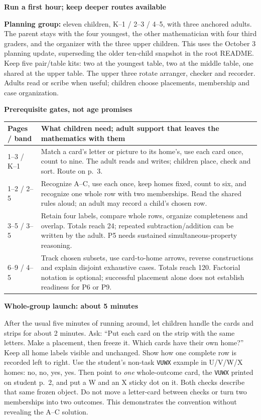 \documentclass[11pt]{article}
\newcommand{\heading}[1]{\par\textbf{\large #1}\par}
\newcommand{\subhead}[1]{\par\textbf{#1}\par}
\newcommand{\row}[1]{\texttt{#1}}
\newcommand{\guidepage}{\newpage}
\begin{document}
\guidepage
\heading{Run a first hour; keep deeper routes available}

\textbf{Planning group:} eleven children, K--1 / 2--3 / 4--5, with three anchored adults. The parent stays with the four youngest, the other mathematician with four third graders, and the organizer with the three upper children. This uses the October 3 planning update, superseding the older ten-child snapshot in the root README. Keep five pair/table kits: two at the youngest table, two at the middle table, one shared at the upper table. The upper three rotate arranger, checker and recorder. Adults read or scribe when useful; children choose placements, membership and case organization.

\subhead{Prerequisite gates, not age promises}
\begin{tabularx}{\linewidth}{@{}p{24mm}X@{}}\toprule
Pages / band & What children need; adult support that leaves the mathematics with them\\\midrule
1--3 / K--1 & Match a card's letter or picture to its home's, use each card once, count to nine. The adult reads and writes; children place, check and sort. Route on p.~3.\\
1--2 / 2--5 & Recognize A--C, use each once, keep homes fixed, count to six, and recognize one whole row with two memberships. Read the shared rules aloud; an adult may record a child's chosen row.\\
3--5 / 3--5 & Retain four labels, compare whole rows, organize completeness and overlap. Totals reach 24; repeated subtraction/addition can be written by the adult. P5 needs sustained simultaneous-property reasoning.\\
6--9 / 4--5 & Track chosen subsets, use card-to-home arrows, reverse constructions and explain disjoint exhaustive cases. Totals reach 120. Factorial notation is optional; successful placement alone does not establish readiness for P6 or P9.\\\bottomrule
\end{tabularx}

\subhead{Whole-group launch: about 5 minutes}
After the usual five minutes of running around, let children handle the cards and strips for about 2 minutes. Ask: ``Put each card on the strip with the same letters. Make a placement, then freeze it. Which cards have their own home?'' Keep all home labels visible and unchanged. Show how one complete row is recorded left to right. Use the student's non-task \row{VUWX} example in U/V/W/X homes: no, no, yes, yes. Then point to \emph{one} whole-outcome card, the \row{VUWX} printed on student p.~2, and put a W and an X sticky dot on it. Both checks describe that same frozen object. Do not move a letter-card between checks or turn two memberships into two outcomes. This demonstrates the convention without revealing the A--C solution.
\end{document}
